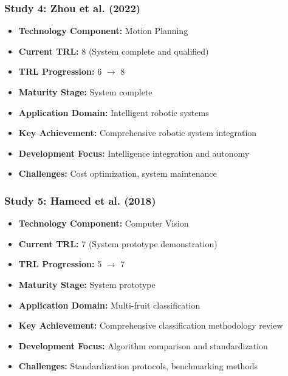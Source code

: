 \documentclass[11pt]{article}
\begin{document}
\subsubsection{Study 4: Zhou et al. (2022) \cite{zhou2022intelligent}}
\begin{itemize}
    \item \textbf{Technology Component:} Motion Planning
    \item \textbf{Current TRL:} 8 (System complete and qualified)
    \item \textbf{TRL Progression:} 6 $\rightarrow$ 8
    \item \textbf{Maturity Stage:} System complete
    \item \textbf{Application Domain:} Intelligent robotic systems
    \item \textbf{Key Achievement:} Comprehensive robotic system integration
    \item \textbf{Development Focus:} Intelligence integration and autonomy
    \item \textbf{Challenges:} Cost optimization, system maintenance
\end{itemize}

\subsubsection{Study 5: Hameed et al. (2018) \cite{hameed2018comprehensive}}
\begin{itemize}
    \item \textbf{Technology Component:} Computer Vision
    \item \textbf{Current TRL:} 7 (System prototype demonstration)
    \item \textbf{TRL Progression:} 5 $\rightarrow$ 7
    \item \textbf{Maturity Stage:} System prototype
    \item \textbf{Application Domain:} Multi-fruit classification
    \item \textbf{Key Achievement:} Comprehensive classification methodology review
    \item \textbf{Development Focus:} Algorithm comparison and standardization
    \item \textbf{Challenges:} Standardization protocols, benchmarking methods
\end{itemize}
\end{document}

